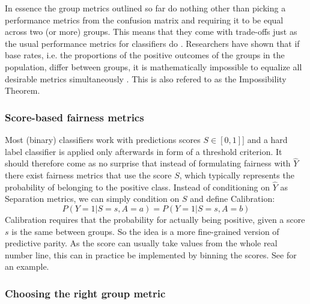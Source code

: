 In essence the group metrics outlined so far do nothing other than picking a performance metrics from the confusion matrix and requiring it to be equal across two (or more) groups.
This means that they come with trade-offs just as the usual performance metrics for classifiers do \cite{kleinberg2017}. Researchers have shown that if base rates, i.e. the proportions of the positive outcomes of the groups in the population, differ between groups, it is mathematically impossible to equalize all desirable metrics simultaneously \cite{Chouldechova2016FairPW}. This is also refered to as the Impossibility Theorem.

\subsubsection*{Score-based fairness metrics}
Most (binary) classifiers work with predictions scores $S \in [0,1]]$ and a hard label classifier is applied only afterwards in form of a threshold criterion. It should therefore come as no surprise that instead of formulating fairness with $\hat{Y}$ there exist fairness metrics that use the score $S$, which typically represents the probability of belonging to the positive class. Instead of conditioning on $\hat{Y}$ as Separation metrics, we can simply condition on $S$ and define Calibration:
$$P(Y = 1 | S = s, A = a) = P(Y = 1 | S = s, A = b)$$
Calibration requires that the probability for actually being positive, given a score $s$ is the same between groups. So the idea is a more fine-grained version of predictive parity. As the score can usually take values from the whole real number line, this can in practice be implemented by binning the scores. See \cite{verma2018} for an example.

\subsubsection*{Choosing the right group metric}

